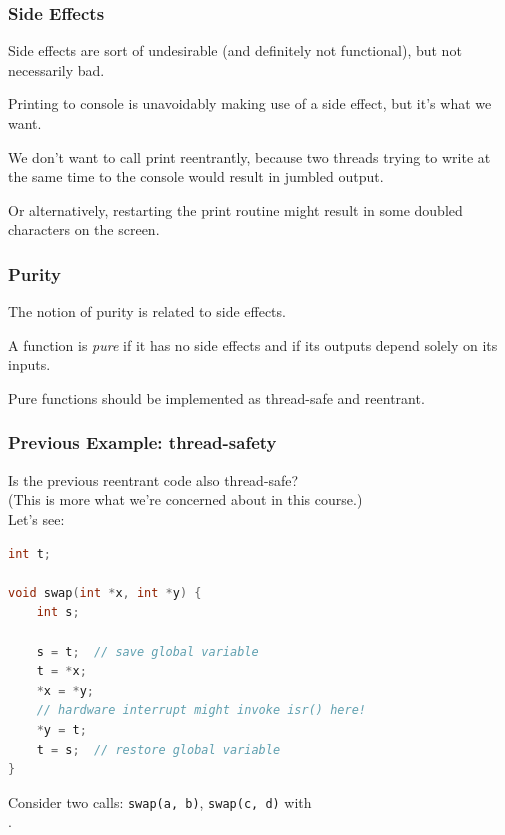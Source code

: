 \begin{frame}
\frametitle{Side Effects}

Side effects are sort of undesirable (and definitely not functional), but not necessarily bad. 

Printing to console is unavoidably making use of a side effect, but it's what we want. 

We don't want to call print reentrantly, because two threads trying to write at the same time to the console would result in jumbled output. 

Or alternatively, restarting the print routine might result in some doubled characters on the screen.

\end{frame}

\begin{frame}
\frametitle{Purity}

The notion of purity is related to side effects.

A function is \emph{pure} if it has no side effects and if its outputs depend solely on its inputs.

Pure functions should be implemented as thread-safe and reentrant.

\end{frame}

\begin{frame}[fragile]
  \frametitle{Previous Example: thread-safety}

  
  Is the previous reentrant code also thread-safe?\\

  (This is more what we're concerned about in this course.)\\[1em]

  Let's see:
  \begin{lstlisting}[language=C]
int t;

void swap(int *x, int *y) {
    int s;
 
    s = t;  // save global variable
    t = *x;
    *x = *y;
    // hardware interrupt might invoke isr() here!
    *y = t;
    t = s;  // restore global variable
}
  \end{lstlisting}
  
  Consider two calls: {\tt swap(a, b)}, {\tt swap(c, d)} with\\
  .
  
\end{frame}


